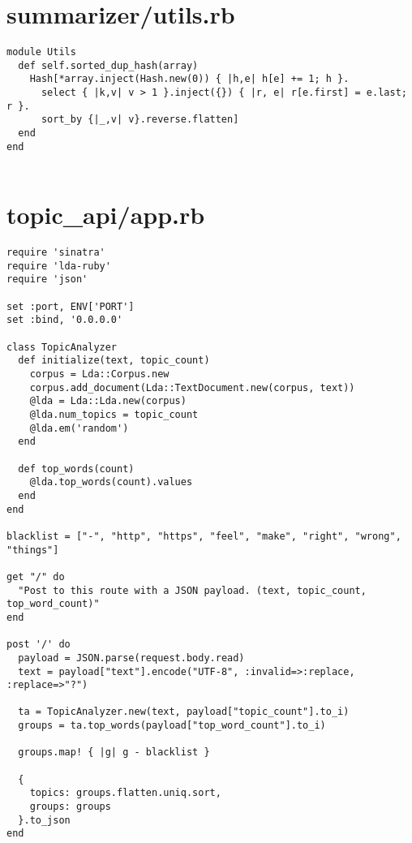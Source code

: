 \documentclass{article}
\begin{document}
\section*{summarizer/utils.rb}
\begin{verbatim}
module Utils
  def self.sorted_dup_hash(array)
    Hash[*array.inject(Hash.new(0)) { |h,e| h[e] += 1; h }.
      select { |k,v| v > 1 }.inject({}) { |r, e| r[e.first] = e.last; r }.
      sort_by {|_,v| v}.reverse.flatten]
  end
end


\end{verbatim}
\pagebreak

\section*{topic\_api/app.rb}
\begin{verbatim}
require 'sinatra'
require 'lda-ruby'
require 'json'

set :port, ENV['PORT']
set :bind, '0.0.0.0'

class TopicAnalyzer
  def initialize(text, topic_count)
    corpus = Lda::Corpus.new
    corpus.add_document(Lda::TextDocument.new(corpus, text))
    @lda = Lda::Lda.new(corpus)
    @lda.num_topics = topic_count
    @lda.em('random')
  end

  def top_words(count)
    @lda.top_words(count).values
  end
end

blacklist = ["-", "http", "https", "feel", "make", "right", "wrong", "things"]

get "/" do
  "Post to this route with a JSON payload. (text, topic_count, top_word_count)"
end

post '/' do
  payload = JSON.parse(request.body.read)
  text = payload["text"].encode("UTF-8", :invalid=>:replace, :replace=>"?")

  ta = TopicAnalyzer.new(text, payload["topic_count"].to_i)
  groups = ta.top_words(payload["top_word_count"].to_i)

  groups.map! { |g| g - blacklist }

  {
    topics: groups.flatten.uniq.sort,
    groups: groups
  }.to_json
end


\end{verbatim}
\pagebreak
\end{document}
